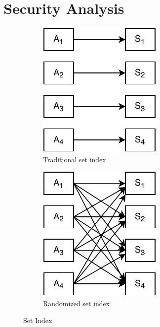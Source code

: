 \section{Security Analysis}
\begin{figure}
\centering
\begin{subfigure}{.4\columnwidth}
  \centering
  \includegraphics[width=0.8\linewidth]{figures/Set_diagram.pdf}
  \caption{Traditional set index}
  \label{fig:one-to-one}
\end{subfigure}%
\begin{subfigure}{.4\columnwidth}
  \centering
  \includegraphics[width=0.8\linewidth]{figures/many-to-many.pdf}
  \caption{Randomized set index}
  \label{fig:many-to-many}
\end{subfigure}
\caption{Set Index}
\label{fig:set_diagram}
\end{figure}
